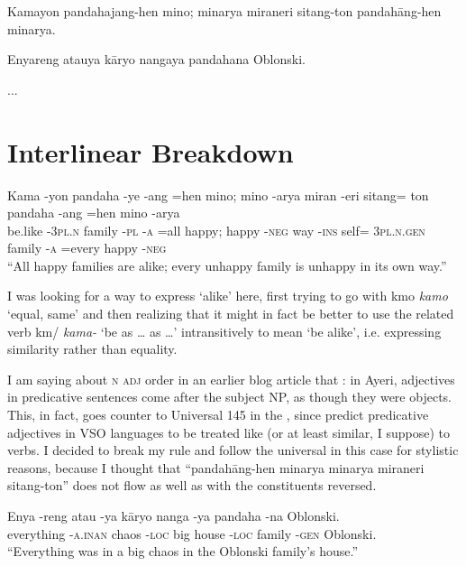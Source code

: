\documentclass[12pt,paper=letter]{scrartcl}
\newcommand{\fw}[1]{\textit{#1}} %
\newcommand{\q}[1]{\enquote{#1}} %
\newcommand{\qq}[1]{\enquote*{#1}} %
\newcommand{\mor}[1]{\textsc{\lowercase{#1}}}
\newcommand{\ayr}[1]{{\Tagati #1}}
\begin{document}
\noindent Kamayon pandahajang-hen mino; minarya miraneri sitang-ton 
pandahāng-hen minarya.

Enyareng atauya kāryo nangaya pandahana Oblonski.

...

\section{Interlinear Breakdown}

\begin{exe}
    \ex \label{ex:1}
    \gll Kama -yon pandaha -ye -ang =hen mino; mino -arya miran -eri sitang= ton 
	pandaha -ang =hen mino -arya \\
    be.like -\mor{3PL.N} family -\mor{PL} -\mor{A} =all happy; happy -\mor{NEG} 
	way -\mor{INS} self= \mor{3PL.N.GEN} family -\mor{A} =every happy
	-\mor{NEG} \\
    \glt \enquote{All happy families are alike; every unhappy family is unhappy 
	in its own way.}
\end{exe}

I was looking for a way to express \qq{alike} here, first trying to go with
\ayr{kmo} \fw{kamo} \qq{equal, same} and then realizing that it might in fact
be better to use the related verb \ayr{km/} \fw{kama-} \qq{be as … as …}
intransitively to mean \qq{be alike}, i.e. expressing similarity rather than 
equality.

I am saying about \mor{N ADJ} order in an earlier blog article that 
: in Ayeri, adjectives in predicative sentences come after
the subject NP, as though they were objects. This, in fact, goes counter to 
Universal 145 in the  \autocite{universalsarchive},
since \citeauthor{universalsarchive} predict predicative adjectives in VSO 
languages to be treated like (or at least similar, I suppose) to verbs. I 
decided to break my rule and follow the universal in this case for stylistic 
reasons, because I thought that \q{pandahāng-hen minarya minarya miraneri 
sitang-ton} does not flow as well as with the constituents reversed.

\begin{exe}
    \ex
    \gll Enya -reng atau -ya kāryo nanga -ya pandaha -na Oblonski. \\
    everything -\mor{A.INAN} chaos -\mor{LOC} big house -\mor{LOC} family 
	-\mor{GEN} Oblonski. \\
    \glt \enquote{Everything was in a big chaos in the Oblonski family's house.}
\end{exe}
\end{document}
